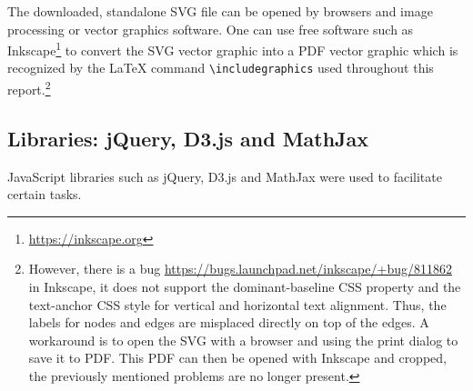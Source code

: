 The downloaded, standalone SVG file can be opened by browsers and image processing or vector graphics software. One can use free software such as Inkscape\footnote{\url{https://inkscape.org}} to convert the SVG vector graphic into a PDF vector graphic which is recognized by the \LaTeX{} command \texttt{\textbackslash includegraphics} used throughout this report.\footnote{However, there is a bug \url{https://bugs.launchpad.net/inkscape/+bug/811862} in Inkscape, it does not support the dominant-baseline CSS property and the text-anchor CSS style for vertical and horizontal text alignment. Thus, the labels for nodes and edges are misplaced directly on top of the edges. A workaround is to open the SVG with a browser and using the print dialog to save it to PDF. This PDF can then be opened with Inkscape and cropped, the previously mentioned problems are no longer present.}
\subsection{Libraries: jQuery, D3.js and MathJax}\label{sec:libraries}

JavaScript libraries such as jQuery, D3.js and MathJax were used to facilitate certain tasks.


